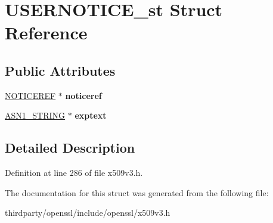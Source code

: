 \hypertarget{struct_u_s_e_r_n_o_t_i_c_e__st}{}\section{U\+S\+E\+R\+N\+O\+T\+I\+C\+E\+\_\+st Struct Reference}
\label{struct_u_s_e_r_n_o_t_i_c_e__st}
\subsection*{Public Attributes}
\begin{DoxyCompactItemize}
\item 
\mbox{\label{struct_u_s_e_r_n_o_t_i_c_e__st_a5d1c9ae026549fc43f6443d1df42b956}} 
\hyperlink{struct_n_o_t_i_c_e_r_e_f__st}{N\+O\+T\+I\+C\+E\+R\+EF} $\ast$ {\bfseries noticeref}
\item 
\mbox{\label{struct_u_s_e_r_n_o_t_i_c_e__st_a7009a63ef5ede50320b870f832a50ecd}} 
\hyperlink{structasn1__string__st}{A\+S\+N1\+\_\+\+S\+T\+R\+I\+NG} $\ast$ {\bfseries exptext}
\end{DoxyCompactItemize}


\subsection{Detailed Description}


Definition at line 286 of file x509v3.\+h.



The documentation for this struct was generated from the following file\+:\begin{DoxyCompactItemize}
\item 
thirdparty/openssl/include/openssl/x509v3.\+h\end{DoxyCompactItemize}
